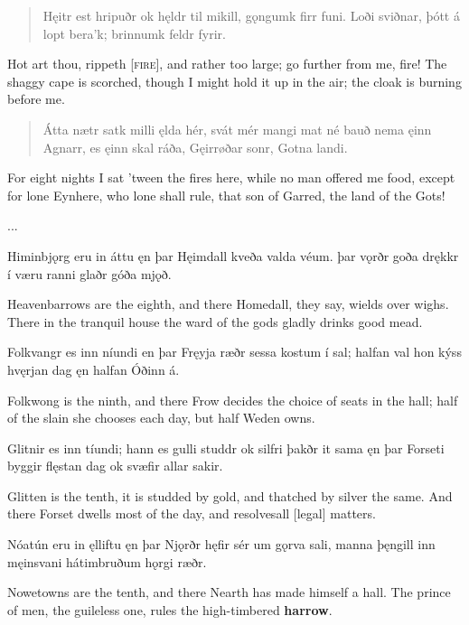 \bookStart

\begin{verse}
\bva Hęitr est hripuðr \hld ok hęldr til mikill,
\ind gǫngumk firr funi.
Loði sviðnar, \hld þótt á lopt bera'k;
\ind brinnumk feldr fyrir. 
\end{verse}

\bvb Hot art thou, rippeth [\textsc{fire}], and rather too large; go further from me, fire! The shaggy cape is scorched, though I might hold it up in the air; the cloak is burning before me.

\begin{verse}
\bva Átta nætr satk \hld milli ęlda hér,
\ind svát mér mangi mat né bauð
nema ęinn Agnarr, \hld es ęinn skal ráða,
\ind Gęirrøðar sonr, Gotna landi.
\end{verse}

\bvb For eight nights I sat ’tween the fires here, while no man offered me food, except for lone Eynhere, who lone shall rule, that son of Garred, the land of the Gots!

...

Himinbjǫrg eru in áttu \hld ęn þar Hęimdall
\ind kveða valda véum.
þar vǫrðr goða \hld drękkr í væru ranni
\ind glaðr góða mjǫð. 

\bvb Heavenbarrows are the eighth, and there Homedall, they say, wields over wighs. There in the tranquil house the ward of the gods gladly drinks good mead.

Folkvangr es inn níundi \hld en þar Fręyja ræðr
\ind sessa kostum í sal;
halfan val \hld hon kýss hvęrjan dag
\ind ęn halfan Óðinn á. 

\bvb Folkwong is the ninth, and there Frow decides the choice of seats in the hall; half of the slain she chooses each day, but half Weden owns.

Glitnir es inn tíundi; \hld hann es gulli studdr
\ind ok silfri þakðr it sama
ęn þar Forseti \hld byggir flęstan dag
\ind ok svæfir allar sakir. 

\bvb Glitten is the tenth, it is studded by gold, and thatched by silver the same. And there Forset dwells most of the day, and resolves\footnotemark[1] all [legal] matters.

Nóatún eru in ęlliftu \hld ęn þar Njǫrðr hęfir
\ind sér um gǫrva sali,
manna þęngill \hld inn męinsvani
\ind hátimbruðum hǫrgi ræðr. 

\bvb Nowetowns are the tenth, and there Nearth has made himself a hall. The prince of men, the guileless one, rules the high-timbered \textbf{harrow}.

